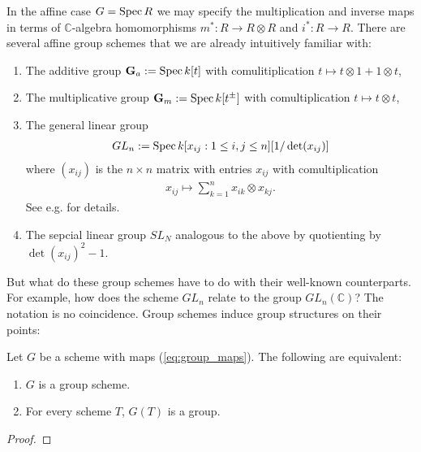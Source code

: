 \documentclass[12pt]{ociamthesis}  %
\begin{document}
\begin{example}\label{ex:group_schemes}
  In the affine case $G = \operatorname{Spec} R$ we may specify the multiplication
  and inverse maps in terms of $\mathbb{C}$-algebra homomorphisms
  $m^* : R \to R\otimes R$ and $i^* : R\to R$.
  There are several affine group schemes that we are already
  intuitively familiar with:
  \begin{enumerate}
    \item The additive group $\mathbf{G}_a := \operatorname{Spec} k[t]$ with
          comulitiplication $t\mapsto t\otimes 1 + 1\otimes t$,
    \item The multiplicative group $\mathbf{G}_m := \operatorname{Spec} k[t^\pm]$
          with comultiplication $t\mapsto t\otimes t$,
    \item The general linear group
          \begin{align*}
            GL_n := \operatorname{Spec} k[x_{ij} : 1\leq i,j\leq n][1/\det(x_{ij})]
          \end{align*}
          where $(x_{ij})$ is the $n\times n$ matrix with entries $x_{ij}$
          with comultiplication
          \begin{align*}
            x_{ij} \mapsto \sum_{k=1}^n x_{ik}\otimes x_{kj}.
          \end{align*}
          See e.g. \cite[\href{https://stacks.math.columbia.edu/tag/022W}{Tag 022W}]{stacks-project} for details.
    \item The sepcial linear group $SL_N$ analogous to the above by
          quotienting by $\det(x_{ij})^2 - 1$.
  \end{enumerate}
\end{example}
But what do these group schemes have to do with their well-known
counterparts. For example, how does the scheme $GL_n$ relate to the
group $GL_n(\mathbb{C})$? The notation is no coincidence.
Group schemes induce group structures on their points:
\begin{lemma}
  Let $G$ be a scheme with maps (\ref{eq:group_maps}). The following
  are equivalent:
  \begin{enumerate}
    \item $G$ is a group scheme.
    \item For every scheme $T$, $G(T)$ is a group.
  \end{enumerate}
  \begin{proof}

    \missingproof
  \end{proof}
\end{lemma}
\end{document}
